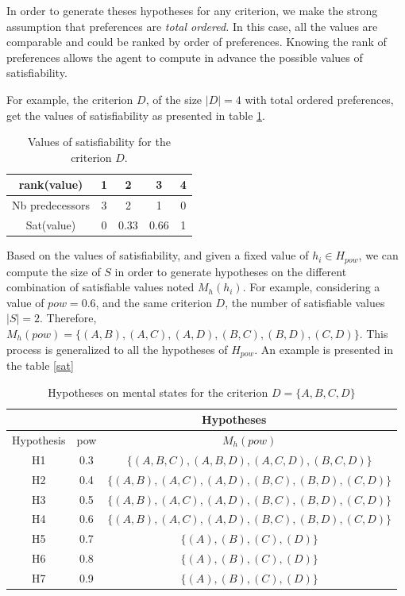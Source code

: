 \documentclass[sigconf]{aamas}  %
\begin{document}
	\par In order to generate theses hypotheses for any criterion, we make the strong assumption that preferences are \emph{total ordered.} In this case, all the values are comparable and could be ranked by order of preferences. Knowing the rank of preferences allows the agent to compute in advance the possible values of satisfiability.
	
	For example, the criterion $D$, of the size  $|D| = 4$ with total ordered preferences, get the values of satisfiability as presented in table \ref{tab:poss}.
	\begin{table}[h]
		\centering
		\begin{tabular}{ |c|c|c|c|c| }
			\hline				
			rank(value) & 1 & 2 & 3 & 4 \\
			\hline
			Nb predecessors & 3 & 2 & 1& 0 \\
			\hline
			Sat(value) & 0 & 0.33 & 0.66 &1 \\
			\hline
			
		\end{tabular}
		\caption{Values of satisfiability for the criterion $D$.}
		\label{tab:poss}
	\end{table}
	
	Based on the values of satisfiability, and given a fixed value of $h_i \in H_{pow}$, we can compute the size of $S$ in order to generate hypotheses on the different combination of satisfiable values  noted $M_h(h_i)$. For example, considering a value of $pow =0.6$, and the same criterion $D$, the number of satisfiable values $|S| = 2$. Therefore, $M_h(pow) = \{(A,B), (A,C), (A,D), (B,C), (B,D), (C,D)\}$. This process is generalized to all the hypotheses of $H_{pow}$. An example is presented in the table \ref{sat}
	
	
	
	
	\begin{table}[h]
		\centering
		\begin{tabular}{ |c|c|c| }
			\hline
			& \multicolumn{2}{c|}{Hypotheses}  \\
			\hline
			Hypothesis & pow & $M_h(pow)$ \\
			\hline
			H1&0.3&$\{ (A,B,C) , (A,B,D), (A,C,D), (B,C,D) \}$ \\
			\hline
			H2&0.4&$\{ (A,B), (A,C), (A,D), (B,C), (B,D), (C,D) \}$ \\
			\hline
			H3&0.5&$\{ (A,B), (A,C), (A,D), (B,C), (B,D), (C,D) \}$\\
			\hline
			H4&0.6&$\{ (A,B), (A,C), (A,D), (B,C), (B,D), (C,D) \}$ \\
			\hline
			H5&0.7&$\{ (A), (B), (C), (D) \}$\\
			\hline
			H6&0.8&$\{ (A), (B), (C), (D) \}$ \\
			\hline
			H7&0.9&$\{ (A), (B), (C), (D) \}$ \\
			\hline
		\end{tabular}
		\caption{Hypotheses on mental states for the criterion $D=\{A, B, C, D\}$}
		\label{table:poss}
	\end{table}
	
\end{document}
